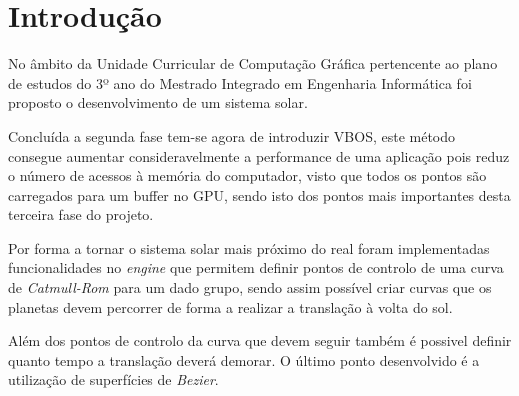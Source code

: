 \chapter{Introdução}
\label{cap:intro}

No âmbito da Unidade Curricular de Computação Gráfica pertencente ao plano de estudos do 3º ano do Mestrado Integrado em Engenharia Informática foi proposto o desenvolvimento de um sistema solar. 

Concluída a segunda fase tem-se agora de introduzir VBOS, este método consegue aumentar consideravelmente a performance de uma aplicação pois reduz o número de acessos à memória do computador, visto que todos os pontos são carregados para um buffer no GPU, sendo isto dos pontos mais importantes desta terceira fase do projeto. 

Por forma a tornar o sistema solar mais próximo do real foram implementadas funcionalidades no \textit{engine} que permitem definir pontos de controlo de uma curva de \textit{Catmull-Rom} para um dado grupo, sendo assim possível criar curvas que os planetas devem percorrer de forma a realizar a translação à volta do sol. 

Além dos pontos de controlo da curva que devem seguir também é  possivel definir quanto tempo a translação deverá demorar. O último ponto desenvolvido é a utilização de superfícies de \textit{Bezier}.

